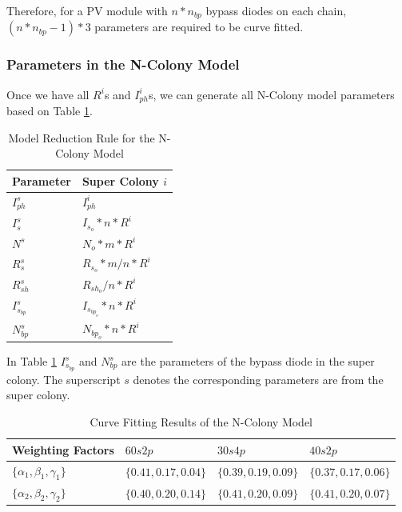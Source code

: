 Therefore, for a PV module with $n*n_{bp}$ bypass diodes on each chain, $(n*n_{bp} - 1)*3$ parameters are required to be curve fitted.

\subsubsection{Parameters in the N-Colony Model}
Once we have all $R^i$s and $I_{ph}^i$s, we can generate all N-Colony model parameters based on Table \ref{table:ncRule}.
\begin{table}[tb]
  \caption{Model Reduction Rule for the N-Colony Model }
  \label{table:ncRule}
  \centering
  \normalsize
\begin{tabular}{|l|l|}
  \hline
  Parameter & Super Colony $i$ \\
  \hline
  $I_{ph}^s$ & $I_{ph}^i$ \\
  \hline
  $I_s^s$ & $I_{s_o}*n*R^i $\\
  \hline
  $N^s$ & $N_o*m*R^i $\\
  \hline
  $R_s^s$ & $R_{s_o}*m/n*R^i$ \\
  \hline
  $R_{sh}^s$ & $R_{sh_o}/n*R^i$  \\
  \hline
  $I_{s_{bp}}^s$ & $I_{s_{bp_o}}*n*R^i$  \\
  \hline
  $N_{bp}^s$ & $N_{bp_o}*n*R^i$  \\
  \hline
\end{tabular}
\end{table}
In Table \ref{table:ncRule} $I_{s_{bp}}^s$ and $N_{bp}^s$ are the parameters of the bypass diode in the super colony. The superscript $s$ denotes the corresponding parameters are from the super colony.

\begin{table}[tb]
  \caption{Curve Fitting Results of the N-Colony Model}
  \label{table:ncCurveFit}
  \centering
  \normalsize
\begin{tabular}{|l|l|l|l|}
  \hline
  Weighting Factors & $60s2p$ & $30s4p$ & $40s2p$\\
  \hline
  $\{\alpha_1, \beta_1, \gamma_1\}$ &$\{0.41, 0.17, 0.04\} $ & $\{0.39, 0.19, 0.09\} $ & $\{0.37, 0.17, 0.06\}$ \\
  \hline
  $\{\alpha_2, \beta_2, \gamma_2\}$ &$\{0.40, 0.20, 0.14\} $ & $\{0.41, 0.20, 0.09\} $ & $\{0.41, 0.20, 0.07\}$ \\
  \hline
\end{tabular}
\end{table}


